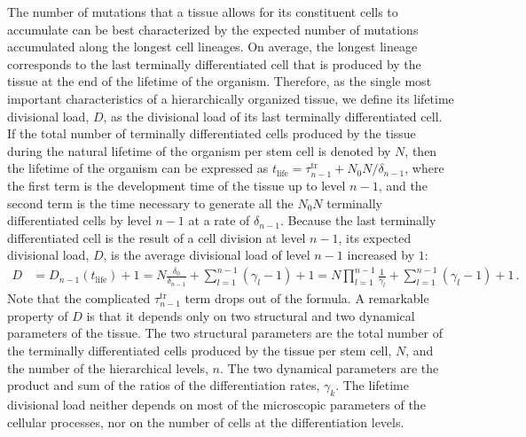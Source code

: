 \documentclass[aps,singlecolumn]{revtex4-1}
\begin{document}
The number of mutations that a tissue allows for its constituent cells
to accumulate can be best characterized by the expected number of
mutations accumulated along the longest cell lineages. On average, the
longest lineage corresponds to the last terminally differentiated cell
that is produced by the tissue at the end of the lifetime of the
organism. Therefore, as the single most important characteristics of a
hierarchically organized tissue, we define its lifetime divisional
load, $D$, as the divisional load of its last terminally differentiated
cell. If the total number of terminally differentiated cells produced
by the tissue during the natural lifetime of the organism per stem cell
is denoted by $N$, then the lifetime of the organism can be expressed as
$t_\textrm{life} = \tau_{n-1}^\textrm{tr} + N_0 N/\delta_{n-1}$,
where the first term is the development time of the tissue up to level
$n-1$, and the second term is the time necessary to generate all the
$N_0 N$ terminally differentiated cells by level $n-1$ at a rate of
$\delta_{n-1}$. Because the last terminally
differentiated cell is the result of a cell division at level $n-1$,
its expected divisional load, $D$, is the average
divisional load of level $n-1$ increased by $1$:
%
\begin{align}
 D &=
 D_{n-1} \left( t_\textrm{life} \right) +1
 = N \frac{\delta_0}{\delta_{n-1}}
  + \sum_{l=1}^{n-1} (\gamma_l - 1) + 1
 = N \prod_{l=1}^{n-1} \frac{1}{\gamma_l}
  + \sum_{l=1}^{n-1} (\gamma_l - 1) + 1
\, .
\label{D}
\end{align}
%
Note that the complicated $\tau_{n-1}^\textrm{tr}$ term drops out of
the formula.
A remarkable property of $D$ is that it
depends only on two structural and two dynamical parameters of the
tissue. The two structural parameters are the total number of the
terminally differentiated cells produced by the tissue per stem cell,
$N$, and the number of the hierarchical levels, $n$. The two dynamical
parameters are the product and sum of the ratios
of the differentiation rates, $\gamma_k$.
The lifetime divisional load neither depends on most of
the microscopic parameters of the cellular processes, nor
on the number of cells at the differentiation levels.
\end{document}
